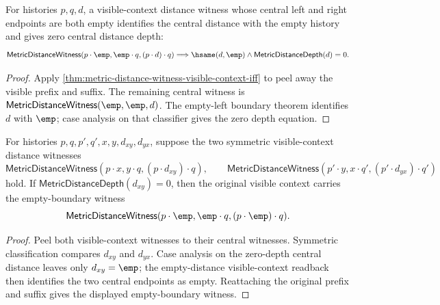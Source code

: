 \begin{theorem}
\label{thm:metric-distance-witness-empty-boundary-visible-context-distance-empty}
For histories $p,q,d$, a visible-context distance witness whose central left and
right endpoints are both empty identifies the central distance with the empty
history and gives zero central distance depth:
$$
\mathsf{MetricDistanceWitness}(p\cdot\emp,\emp\cdot q,(p\cdot d)\cdot q)
\Longrightarrow
\hsame(d,\emp)\wedge\mathsf{MetricDistanceDepth}(d)=0.
$$
\end{theorem}
\begin{proof}
Apply \autoref{thm:metric-distance-witness-visible-context-iff} to peel away
the visible prefix and suffix. The remaining central witness is
$\mathsf{MetricDistanceWitness}(\emp,\emp,d)$. The empty-left boundary theorem
identifies $d$ with $\emp$; case analysis on that classifier gives the zero
depth equation.
\end{proof}

\begin{theorem}
\label{thm:metric-distance-witness-prefix-independent-symmetric-zero-depth-empty-boundary-forward}
For histories $p,q,p',q',x,y,d_{xy},d_{yx}$, suppose the two symmetric
visible-context distance witnesses
$$
\mathsf{MetricDistanceWitness}(p\cdot x,y\cdot q,(p\cdot d_{xy})\cdot q),
\qquad
\mathsf{MetricDistanceWitness}(p'\cdot y,x\cdot q',(p'\cdot d_{yx})\cdot q')
$$
hold. If $\mathsf{MetricDistanceDepth}(d_{xy})=0$, then the original visible
context carries the empty-boundary witness
$$
\mathsf{MetricDistanceWitness}(p\cdot\emp,\emp\cdot q,(p\cdot\emp)\cdot q).
$$
\end{theorem}
\begin{proof}
Peel both visible-context witnesses to their central witnesses. Symmetric
classification compares $d_{xy}$ and $d_{yx}$. Case analysis on the zero-depth
central distance leaves only $d_{xy}=\emp$; the empty-distance visible-context
readback then identifies the two central endpoints as empty. Reattaching the
original prefix and suffix gives the displayed empty-boundary witness.
\end{proof}

